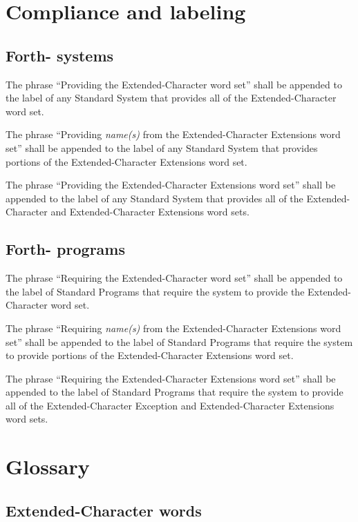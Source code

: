 \section{Compliance and labeling} %

\subsection{Forth-\snapshot{} systems} %

The phrase ``Providing the Extended-Character word set'' shall be
appended to the label of any Standard System that provides all of
the Extended-Character word set.

The phrase ``Providing \emph{name(s)} from the Extended-Character
Extensions word set'' shall be appended to the label of any Standard
System that provides portions of the Extended-Character Extensions
word set.

The phrase ``Providing the Extended-Character Extensions word set''
shall be appended to the label of any Standard System that provides
all of the Extended-Character and Extended-Character Extensions
word sets.

\subsection{Forth-\snapshot{} programs} %

The phrase ``Requiring the Extended-Character word set'' shall be
appended to the label of Standard Programs that require the system
to provide the Extended-Character word set.

The phrase ``Requiring \emph{name(s)} from the Extended-Character
Extensions word set'' shall be appended to the label of Standard Programs
that require the system to provide portions of the Extended-Character
Extensions word set.

The phrase ``Requiring the Extended-Character Extensions word set''
shall be appended to the label of Standard Programs that require the
system to provide all of the Extended-Character Exception and
Extended-Character Extensions word sets.

\section{Glossary} %

\subsection{Extended-Character words} %

